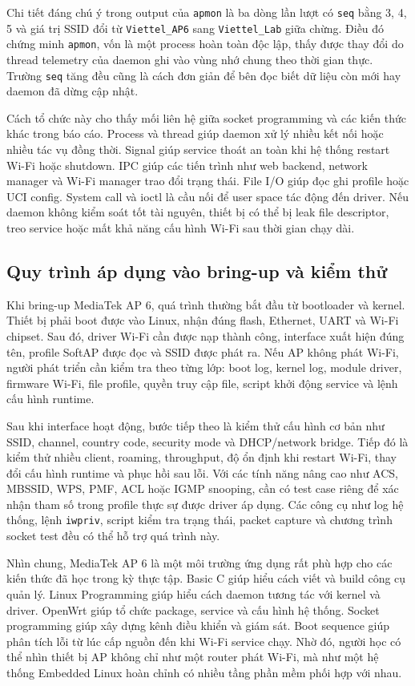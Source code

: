 \documentclass[11pt]{article}
\newcommand{\code}[1]{\texttt{#1}}
\begin{document}
Chi tiết đáng chú ý trong output của \code{apmon} là ba dòng lần lượt có \code{seq} bằng 3, 4, 5 và giá trị SSID đổi từ \code{Viettel\_AP6} sang \code{Viettel\_Lab} giữa chừng. Điều đó chứng minh \code{apmon}, vốn là một process hoàn toàn độc lập, thấy được thay đổi do thread telemetry của daemon ghi vào vùng nhớ chung theo thời gian thực. Trường \code{seq} tăng đều cũng là cách đơn giản để bên đọc biết dữ liệu còn mới hay daemon đã dừng cập nhật.

Cách tổ chức này cho thấy mối liên hệ giữa socket programming và các kiến thức khác trong báo cáo. Process và thread giúp daemon xử lý nhiều kết nối hoặc nhiều tác vụ đồng thời. Signal giúp service thoát an toàn khi hệ thống restart Wi-Fi hoặc shutdown. IPC giúp các tiến trình như web backend, network manager và Wi-Fi manager trao đổi trạng thái. File I/O giúp đọc ghi profile hoặc UCI config. System call và ioctl là cầu nối để user space tác động đến driver. Nếu daemon không kiểm soát tốt tài nguyên, thiết bị có thể bị leak file descriptor, treo service hoặc mất khả năng cấu hình Wi-Fi sau thời gian chạy dài.

\subsection{Quy trình áp dụng vào bring-up và kiểm thử}

Khi bring-up MediaTek AP 6, quá trình thường bắt đầu từ bootloader và kernel. Thiết bị phải boot được vào Linux, nhận đúng flash, Ethernet, UART và Wi-Fi chipset. Sau đó, driver Wi-Fi cần được nạp thành công, interface xuất hiện đúng tên, profile SoftAP được đọc và SSID được phát ra. Nếu AP không phát Wi-Fi, người phát triển cần kiểm tra theo từng lớp: boot log, kernel log, module driver, firmware Wi-Fi, file profile, quyền truy cập file, script khởi động service và lệnh cấu hình runtime.

Sau khi interface hoạt động, bước tiếp theo là kiểm thử cấu hình cơ bản như SSID, channel, country code, security mode và DHCP/network bridge. Tiếp đó là kiểm thử nhiều client, roaming, throughput, độ ổn định khi restart Wi-Fi, thay đổi cấu hình runtime và phục hồi sau lỗi. Với các tính năng nâng cao như ACS, MBSSID, WPS, PMF, ACL hoặc IGMP snooping, cần có test case riêng để xác nhận tham số trong profile thực sự được driver áp dụng. Các công cụ như log hệ thống, lệnh \code{iwpriv}, script kiểm tra trạng thái, packet capture và chương trình socket test đều có thể hỗ trợ quá trình này.

Nhìn chung, MediaTek AP 6 là một môi trường ứng dụng rất phù hợp cho các kiến thức đã học trong kỳ thực tập. Basic C giúp hiểu cách viết và build công cụ quản lý. Linux Programming giúp hiểu cách daemon tương tác với kernel và driver. OpenWrt giúp tổ chức package, service và cấu hình hệ thống. Socket programming giúp xây dựng kênh điều khiển và giám sát. Boot sequence giúp phân tích lỗi từ lúc cấp nguồn đến khi Wi-Fi service chạy. Nhờ đó, người học có thể nhìn thiết bị AP không chỉ như một router phát Wi-Fi, mà như một hệ thống Embedded Linux hoàn chỉnh có nhiều tầng phần mềm phối hợp với nhau.
\end{document}
